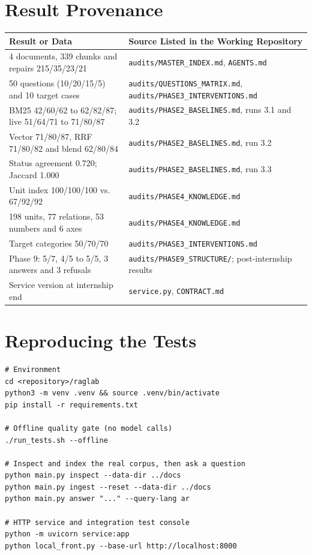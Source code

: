 \documentclass[a4paper,12pt,openany]{report}
\begin{document}
\chapter{Result Provenance}
\begin{table}[htbp]
\centering
\small
\begin{tabular}{p{5.6cm}p{9.0cm}}
\toprule
\textbf{Result or Data} & \textbf{Source Listed in the Working Repository} \\
\midrule
4 documents, 339 chunks and repairs 215/35/23/21 & \texttt{audits/MASTER\_INDEX.md},
\texttt{AGENTS.md} \\
50 questions (10/20/15/5) and 10 target cases & \texttt{audits/QUESTIONS\_MATRIX.md},
\texttt{audits/PHASE3\_INTERVENTIONS.md} \\
BM25 42/60/62 to 62/82/87; live 51/64/71 to 71/80/87 &
\texttt{audits/PHASE2\_BASELINES.md}, runs 3.1 and 3.2 \\
Vector 71/80/87, RRF 71/80/82 and blend 62/80/84 &
\texttt{audits/PHASE2\_BASELINES.md}, run 3.2 \\
Status agreement 0.720; Jaccard 1.000 & \texttt{audits/PHASE2\_BASELINES.md}, run 3.3 \\
Unit index 100/100/100 vs. 67/92/92 & \texttt{audits/PHASE4\_KNOWLEDGE.md} \\
198 units, 77 relations, 53 numbers and 6 axes & \texttt{audits/PHASE4\_KNOWLEDGE.md} \\
Target categories 50/70/70 & \texttt{audits/PHASE3\_INTERVENTIONS.md} \\
Phase 9: 5/7, 4/5 to 5/5, 3 answers and 3 refusals & \texttt{audits/PHASE9\_STRUCTURE/};
post-internship results \\
Service version at internship end & \texttt{service.py}, \texttt{CONTRACT.md} \\
\bottomrule
\end{tabular}
\end{table}

\chapter{Reproducing the Tests}
\begin{verbatim}
# Environment
cd <repository>/raglab
python3 -m venv .venv && source .venv/bin/activate
pip install -r requirements.txt

# Offline quality gate (no model calls)
./run_tests.sh --offline

# Inspect and index the real corpus, then ask a question
python main.py inspect --data-dir ../docs
python main.py ingest --reset --data-dir ../docs
python main.py answer "..." --query-lang ar

# HTTP service and integration test console
python -m uvicorn service:app
python local_front.py --base-url http://localhost:8000
\end{verbatim}
\end{document}
